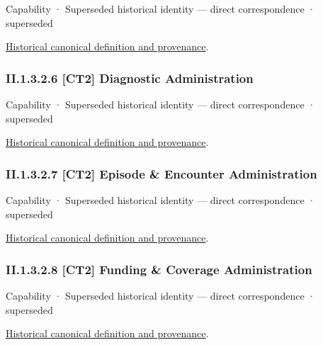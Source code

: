 \label{element:5b1636373a8d4e788b3ddbc1659a47ef}
{\small Capability · Superseded historical identity — direct correspondence · superseded}\par
\href{../../../../continuum/strategy/capability/5b1636373a8d4e788b3ddbc1659a47ef.md}{Historical canonical definition and provenance}.\par
\subsubsection*{II.1.3.2.6 [CT2] Diagnostic Administration}
\label{navigation:II.1.3.2.6}

\label{element:2b1a27d5d9944e05b4cf0fcaad4ca433}
{\small Capability · Superseded historical identity — direct correspondence · superseded}\par
\href{../../../../continuum/strategy/capability/2b1a27d5d9944e05b4cf0fcaad4ca433.md}{Historical canonical definition and provenance}.\par
\subsubsection*{II.1.3.2.7 [CT2] Episode \& Encounter Administration}
\label{navigation:II.1.3.2.7}

\label{element:2778f988e8d44e3091749542c39d38a4}
{\small Capability · Superseded historical identity — direct correspondence · superseded}\par
\href{../../../../continuum/strategy/capability/2778f988e8d44e3091749542c39d38a4.md}{Historical canonical definition and provenance}.\par
\subsubsection*{II.1.3.2.8 [CT2] Funding \& Coverage Administration}
\label{navigation:II.1.3.2.8}

\label{element:58beafcbcd084331be710eb00d27f6cf}
{\small Capability · Superseded historical identity — direct correspondence · superseded}\par
\href{../../../../continuum/strategy/capability/58beafcbcd084331be710eb00d27f6cf.md}{Historical canonical definition and provenance}.\par
